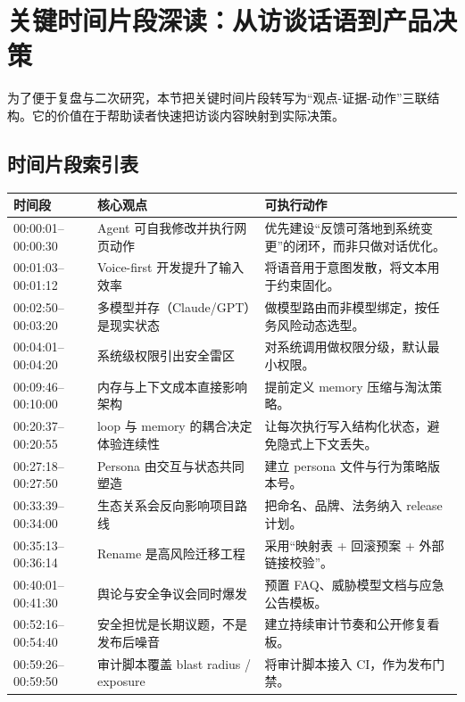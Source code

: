 \section{关键时间片段深读：从访谈话语到产品决策}

为了便于复盘与二次研究，本节把关键时间片段转写为“观点-证据-动作”三联结构。它的价值在于帮助读者快速把访谈内容映射到实际决策。

\subsection{时间片段索引表}

\begin{longtable}{p{}p{}p{}}
\toprule
\textbf{时间段} & \textbf{核心观点} & \textbf{可执行动作} \\
\midrule
00:00:01--00:00:30 & Agent 可自我修改并执行网页动作 & 优先建设“反馈可落地到系统变更”的闭环，而非只做对话优化。 \\
\midrule
00:01:03--00:01:12 & Voice-first 开发提升了输入效率 & 将语音用于意图发散，将文本用于约束固化。 \\
\midrule
00:02:50--00:03:20 & 多模型并存（Claude/GPT）是现实状态 & 做模型路由而非模型绑定，按任务风险动态选型。 \\
\midrule
00:04:01--00:04:20 & 系统级权限引出安全雷区 & 对系统调用做权限分级，默认最小权限。 \\
\midrule
00:09:46--00:10:00 & 内存与上下文成本直接影响架构 & 提前定义 memory 压缩与淘汰策略。 \\
\midrule
00:20:37--00:20:55 & loop 与 memory 的耦合决定体验连续性 & 让每次执行写入结构化状态，避免隐式上下文丢失。 \\
\midrule
00:27:18--00:27:50 & Persona 由交互与状态共同塑造 & 建立 persona 文件与行为策略版本号。 \\
\midrule
00:33:39--00:34:00 & 生态关系会反向影响项目路线 & 把命名、品牌、法务纳入 release 计划。 \\
\midrule
00:35:13--00:36:14 & Rename 是高风险迁移工程 & 采用“映射表 + 回滚预案 + 外部链接校验”。 \\
\midrule
00:40:01--00:41:30 & 舆论与安全争议会同时爆发 & 预置 FAQ、威胁模型文档与应急公告模板。 \\
\midrule
00:52:16--00:54:40 & 安全担忧是长期议题，不是发布后噪音 & 建立持续审计节奏和公开修复看板。 \\
\midrule
00:59:26--00:59:50 & 审计脚本覆盖 blast radius / exposure & 将审计脚本接入 CI，作为发布门禁。 \\

\end{longtable}
